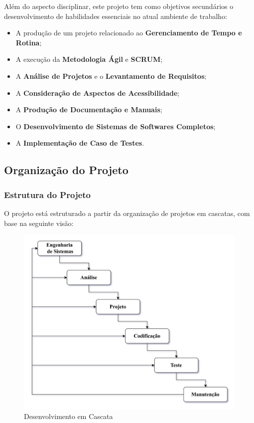 \documentclass[a4paper,12pt]{article}
\begin{document}
Além do aspecto disciplinar, este projeto tem como objetivos secundários o desenvolvimento de habilidades essenciais no 
atual ambiente de trabalho:
\begin{itemize}
    \item A produção de um projeto relacionado ao \textbf{Gerenciamento de Tempo e Rotina};
    \item A execução da \textbf{Metodologia Ágil} e \textbf{SCRUM};
    \item A \textbf{Análise de Projetos} e o \textbf{Levantamento de Requisitos};
    \item A \textbf{Consideração de Aspectos de Acessibilidade};
    \item A \textbf{Produção de Documentação e Manuais};
    \item O \textbf{Desenvolvimento de Sistemas de Softwares Completos};
    \item A \textbf{Implementação de Caso de Testes}.
\end{itemize}

\subsection{Organização do Projeto}
\subsubsection{Estrutura do Projeto}
O projeto está estruturado a partir da organização de projetos em cascatas, com base na seguinte visão:

\vspace{1em}
\begin{figure}[H]
    \centering
    \includegraphics[scale=0.25]{waterfall.drawio.png}
    \caption{Desenvolvimento em Cascata}
\end{figure}
\end{document}
